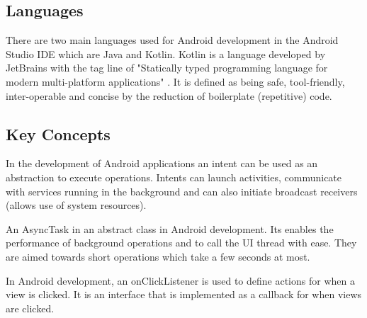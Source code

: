 \tocless\subsection{Languages}
There are two main languages used for Android development in the Android Studio IDE which are Java and Kotlin.
Kotlin is a language developed by JetBrains with the tag line of "Statically typed programming language for modern multi-platform applications" \parencite{kotlin}.
It is defined as being safe, tool-friendly, inter-operable and concise by the reduction of boilerplate (repetitive) code.

\tocless\subsection{Key Concepts}
In the development of Android applications an intent can be used as an abstraction to execute operations.
Intents can launch activities, communicate with services running in the background and can also initiate broadcast receivers (allows use of system resources).

An AsyncTask in an abstract class in Android development.
Its enables the performance of background operations and to call the UI thread with ease.
They are aimed towards short operations which take a few seconds at most.

In Android development, an onClickListener is used to define actions for when a view is clicked.
It is an interface that is implemented as a callback for when views are clicked.